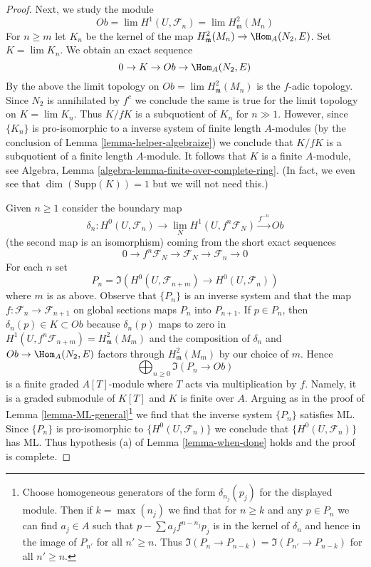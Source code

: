 \begin{proof}
\medskip\noindent
Next, we study the module
$$
Ob = \lim H^1(U, \mathcal{F}_n) = \lim H^2_\mathfrak m(M_n)
$$
For $n \geq m$ let $K_n$ be the kernel of the map
$H^2_\mathfrak m(M_n) \to \Hom_A(N_2, E)$.
Set $K = \lim K_n$. We obtain an exact sequence
$$
0 \to K \to Ob \to \Hom_A(N_2, E)
$$
By the above the limit topology on $Ob = \lim H^2_\mathfrak m(M_n)$
is the $f$-adic topology. Since $N_2$ is annihilated by $f^c$
we conclude the same is true for the limit topology on $K = \lim K_n$.
Thus $K/fK$ is a subquotient of $K_n$ for $n \gg 1$.
However, since $\{K_n\}$ is pro-isomorphic to a inverse system of
finite length $A$-modules (by the conclusion of
Lemma \ref{lemma-helper-algebraize})
we conclude that $K/fK$ is a subquotient of a finite length
$A$-module. It follows that $K$ is a finite $A$-module, see
Algebra, Lemma \ref{algebra-lemma-finite-over-complete-ring}.
(In fact, we even see that $\dim(\text{Supp}(K)) = 1$ but
we will not need this.)

\medskip\noindent
Given $n \geq 1$ consider the boundary map
$$
\delta_n :
H^0(U, \mathcal{F}_n)
\longrightarrow
\lim_N H^1(U, f^n\mathcal{F}_N) \xrightarrow{f^{-n}} Ob
$$
(the second map is an isomorphism)
coming from the short exact sequences
$$
0 \to f^n\mathcal{F}_N \to \mathcal{F}_N \to \mathcal{F}_n \to 0
$$
For each $n$ set
$$
P_n = \Im(H^0(U, \mathcal{F}_{n + m}) \to H^0(U, \mathcal{F}_n))
$$
where $m$ is as above. Observe that $\{P_n\}$ is an inverse
system and that the map $f : \mathcal{F}_n \to \mathcal{F}_{n + 1}$
on global sections maps $P_n$ into $P_{n + 1}$.
If $p \in P_n$, then $\delta_n(p) \in K \subset Ob$
because $\delta_n(p)$ maps to zero in
$H^1(U, f^n\mathcal{F}_{n + m}) = H^2_\mathfrak m(M_m)$
and the composition of $\delta_n$ and $Ob \to \Hom_A(N_2, E)$
factors through $H^2_\mathfrak m(M_m)$ by our choice of $m$.
Hence
$$
\bigoplus\nolimits_{n \geq 0} \Im(P_n \to Ob)
$$
is a finite graded $A[T]$-module where $T$ acts via multiplication by $f$.
Namely, it is a graded submodule of $K[T]$ and $K$ is finite over $A$.
Arguing as in the proof of
Lemma \ref{lemma-ML-general}\footnote{Choose homogeneous generators
of the form $\delta_{n_j}(p_j)$ for the displayed module.
Then if $k = \max(n_j)$ we find that for $n \geq k$
and any $p \in P_n$ we can find $a_j \in A$ such that
$p - \sum a_j f^{n - n_j} p_j$ is in the kernel of $\delta_n$
and hence in the image of $P_{n'}$ for all $n' \geq n$.
Thus $\Im(P_n \to P_{n - k}) = \Im(P_{n'} \to P_{n - k})$
for all $n' \geq n$.}
we find that the inverse system $\{P_n\}$ satisfies ML.
Since $\{P_n\}$ is pro-isomorphic to $\{H^0(U, \mathcal{F}_n)\}$
we conclude that $\{H^0(U, \mathcal{F}_n)\}$ has ML.
Thus hypothesis (a) of Lemma \ref{lemma-when-done}
holds and the proof is complete.
\end{proof}

